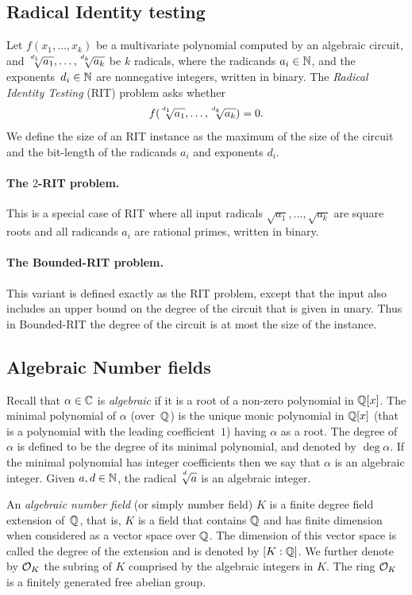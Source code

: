  
\subsection{Radical Identity testing}
 

Let  $f(x_1,\ldots,x_k)$ be  a multivariate polynomial computed by an algebraic circuit, and  $\mysqrt
{d_1}{a_1},\ldots,\mysqrt{d_k}{a_k}$ be  $k$ radicals, where the radicands $a_i\in \mathbb{N}$, and the exponents~$d_i\in \mathbb{N}$ are nonnegative integers,  written in binary.
The \emph{Radical Identity Testing} (RIT) problem asks whether 
\[f( \mysqrt{d_1}{a_1},\ldots,\mysqrt{d_k}{a_k} )=0.\]  
We define the size of an RIT instance as the maximum of
the size of the circuit  and the bit-length of the radicands $a_i$ and exponents $d_i$.

 
\paragraph{The $2$-RIT problem.} This is a special case of RIT 
where all input radicals $\sqrt{a_1},\ldots,\sqrt{a_k}$ are square roots and all radicands $a_i$ are rational primes, written in binary.


\paragraph{The Bounded-RIT problem.}
This variant is defined exactly as the RIT problem,
except that the input also includes an upper bound on the  degree of the circuit that is given in unary. Thus in Bounded-RIT the degree of the circuit is at most the size of the instance. 


\subsection{Algebraic Number fields}

Recall that  $\alpha\in \mathbb{C}$ is \emph{algebraic} if it is a root of a non-zero polynomial in $\mathbb{Q}[x]$. 
The minimal polynomial of $\alpha$ (over~$\mathbb{Q}$) is
the unique monic polynomial in $\mathbb{Q}[x]$ (that is a polynomial with the leading coefficient~$1$) having $\alpha$ as a root.
The degree of $\alpha$ is defined to be the degree of its minimal polynomial, and denoted by $\deg \alpha$. 
 If the minimal polynomial has integer coefficients then we say that $\alpha$ is an algebraic integer.
 Given $a, d \in \mathbb{N}$, the radical $\mysqrt{d}{a}$ is an algebraic integer. 
 


An \emph{algebraic number field} (or simply number field) $K$ is a finite degree field extension of~$\mathbb{Q}$, that is, $K$ is a field that contains $\mathbb{Q}$ and has finite dimension when considered as a vector space over $\mathbb{Q}$. 
The dimension of this vector space is called the degree of the extension and is denoted by $[K:\mathbb{Q}]$. We further denote by $\mathcal{O}_K$  the subring of $K$ comprised by the
algebraic integers
in $K$.
The ring $\mathcal{O}_K$ is a finitely generated free abelian group. 

